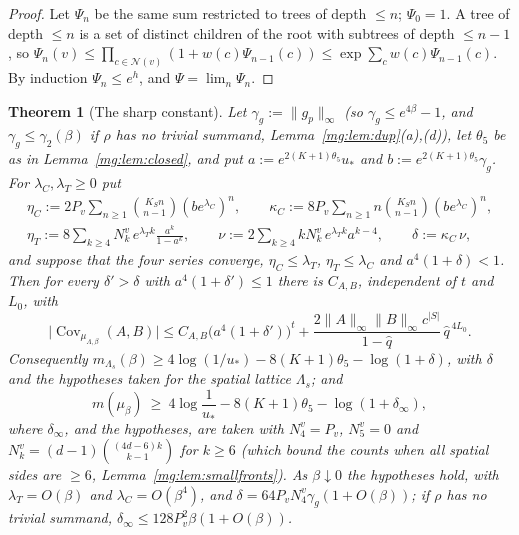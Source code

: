 \documentclass[11pt,a4paper]{article}
\newtheorem{theorem}{Theorem}[section]
\theoremstyle{definition}
\theoremstyle{remark}
\DeclareMathOperator{\Cov}{Cov}
\newcommand{\norm}[1]{\lVert #1\rVert}
\begin{document}
\begin{proof}
Let $\Psi_n$ be the same sum restricted to trees of depth $\le n$; $\Psi_0=1$. A tree of depth $\le n$ is a set of distinct children of the root with
subtrees of depth $\le n-1$, so $\Psi_n(v)\le\prod_{c\in\mathcal N(v)}(1+w(c)\Psi_{n-1}(c))\le\exp\sum_cw(c)\Psi_{n-1}(c)$. By induction
$\Psi_n\le e^h$, and $\Psi=\lim_n\Psi_n$.
\end{proof}

\begin{theorem}[The sharp constant]\label{mg:thm:fronts}
Let $\gamma_g:=\norm{g_p}_\infty$ (so $\gamma_g\le e^{4\beta}-1$, and $\gamma_g\le\gamma_2(\beta)$ if $\rho$ has no trivial summand,
Lemma~\ref{mg:lem:dup}(a),(d)), let $\theta_5$ be as in Lemma~\ref{mg:lem:closed}, and put $a:=e^{2(K+1)\theta_5}u_*$ and
$b:=e^{2(K+1)\theta_5}\gamma_g$. For $\lambda_C,\lambda_T\ge0$ put
\begin{gather*}
\eta_C:=2P_v\sum_{n\ge1}\binom{K_Sn}{n-1}(be^{\lambda_C})^n,\qquad
\kappa_C:=8P_v\sum_{n\ge1}n\binom{K_Sn}{n-1}(be^{\lambda_C})^n,\\
\eta_T:=8\sum_{k\ge4}N^v_k\,e^{\lambda_Tk}\frac{a^k}{1-a^k},\qquad
\nu:=2\sum_{k\ge4}kN^v_k\,e^{\lambda_Tk}a^{k-4},\qquad\delta:=\kappa_C\,\nu,
\end{gather*}
and suppose that the four series converge, $\eta_C\le\lambda_T$, $\eta_T\le\lambda_C$ and $a^4(1+\delta)<1$. Then for every $\delta'>\delta$ with
$a^4(1+\delta')\le1$ there is $C_{A,B}$, independent of $t$ and $L_0$, with
\[
\bigl|\Cov_{\mu_{\Lambda,\beta}}(A,B)\bigr|\le C_{A,B}\bigl(a^4(1+\delta')\bigr)^t+\frac{2\norm A_\infty\norm B_\infty c^{|S|}}{1-\hat q}\,\hat q^{\,4L_0}.
\]
Consequently $m_{\Lambda_s}(\beta)\ge4\log(1/u_*)-8(K+1)\theta_5-\log(1+\delta)$, with $\delta$ and the hypotheses taken for the spatial lattice
$\Lambda_s$; and
\[
m(\mu_\beta)\ \ge\ 4\log\frac1{u_*}-8(K+1)\theta_5-\log(1+\delta_\infty),
\]
where $\delta_\infty$, and the hypotheses, are taken with $N^v_4=P_v$, $N^v_5=0$ and $N^v_k=(d-1)\binom{(4d-6)k}{k-1}$ for $k\ge6$ (which bound the
counts when all spatial sides are $\ge6$, Lemma~\ref{mg:lem:smallfronts}). As $\beta\downarrow0$ the hypotheses hold, with $\lambda_T=O(\beta)$ and
$\lambda_C=O(\beta^4)$, and $\delta=64P_vN^v_4\gamma_g(1+O(\beta))$; if $\rho$ has no trivial summand, $\delta_\infty\le128P_v^2\beta(1+O(\beta))$.
\end{theorem}
\end{document}
